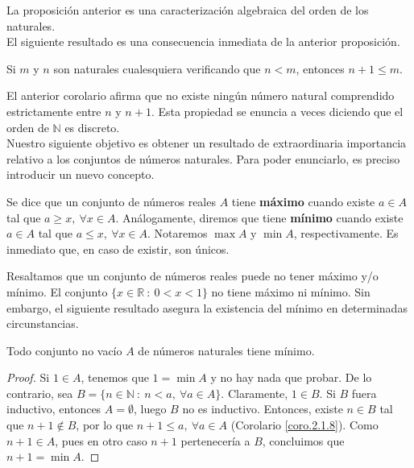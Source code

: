 La proposición anterior es una caracterización algebraica del orden de los naturales.\\

El siguiente resultado es una consecuencia inmediata de la anterior proposición.
\begin{coro}\label{coro.2.1.8}
    Si $m$ y $n$ son naturales cualesquiera verificando que $n < m$, entonces $n+1 \leq m$.
\end{coro}

El anterior corolario afirma que no existe ningún número natural comprendido estrictamente entre
$n$ y $n+1$. Esta propiedad se enuncia a veces diciendo que el orden de $\mathbb{N}$ es discreto.\\

Nuestro siguiente objetivo es obtener un resultado de extraordinaria importancia relativo a los
conjuntos de números naturales. Para poder enunciarlo, es preciso introducir un nuevo concepto.

\begin{definicion}
    Se dice que un conjunto de números reales $A$ tiene \textbf{máximo} cuando existe $a \in A$ tal que
    $a \geq x, ~\forall x \in A$. Análogamente, diremos que tiene \textbf{mínimo} cuando existe $a \in A$ tal que
    $a \leq x, ~\forall x \in A$. Notaremos $\max A$ y $\min A$, respectivamente. Es inmediato que, en caso de
    existir, son únicos.
\end{definicion}

Resaltamos que un conjunto de números reales puede no tener máximo y/o mínimo. El conjunto
$\{x \in \mathbb{R} ~:~ 0 < x < 1\}$ no tiene máximo ni mínimo. Sin embargo, el siguiente resultado
asegura la existencia del mínimo en determinadas circunstancias.

\begin{teo}
    Todo conjunto no vacío $A$ de números naturales tiene mínimo.
\end{teo}
\begin{proof}
    Si $1 \in A$, tenemos que $1 = \min A$ y no hay nada que probar.
    \newline
    \newline
    De lo contrario, sea $B = \{n \in \mathbb{N} ~:~ n < a,~\forall a \in A\}$. Claramente, $1 \in B$.
    Si $B$ fuera inductivo, entonces $A = \emptyset$, luego $B$ no es inductivo. Entonces, existe
    $n \in B$ tal que $n+1 \notin B$, por lo que $n+1 \leq a,~\forall a \in A$ (Corolario \ref{coro.2.1.8}).
    Como $n+1 \in A$, pues en otro caso $n+1$ pertenecería a $B$, concluimos que $n+1 = \min A$.
\end{proof}


